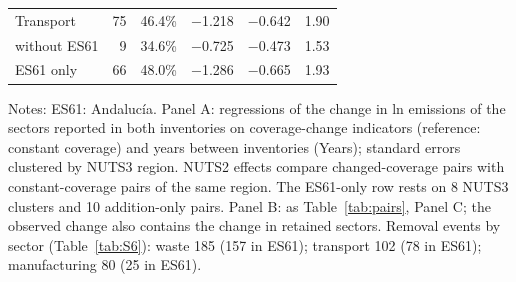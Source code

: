 \begin{table}[width=\linewidth,pos=htbp]
\begin{tabular*}{\tblwidth}{@{}LRRRRR@{}}
Transport & 75 & 46.4\% & $-$1.218 & $-$0.642 & 1.90 \\
\quad without ES61 & 9 & 34.6\% & $-$0.725 & $-$0.473 & 1.53 \\
\quad ES61 only & 66 & 48.0\% & $-$1.286 & $-$0.665 & 1.93 \\
\bottomrule
\end{tabular*}
\par\smallskip\begin{minipage}{\linewidth}\footnotesize Notes: ES61: Andaluc\'ia. Panel A: regressions of the change in ln emissions of the sectors reported in both inventories on coverage-change indicators (reference: constant coverage) and years between inventories (Years); standard errors clustered by NUTS3 region. NUTS2 effects compare changed-coverage pairs with constant-coverage pairs of the same region. The ES61-only row rests on 8 NUTS3 clusters and 10 addition-only pairs. Panel B: as Table~\ref{tab:pairs}, Panel C; the observed change also contains the change in retained sectors. Removal events by sector (Table~\ref{tab:S6}): waste 185 (157 in ES61); transport 102 (78 in ES61); manufacturing 80 (25 in ES61).\end{minipage}
\end{table}

